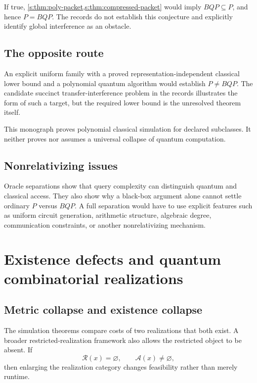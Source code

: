 If true, \cref{s:thm:poly-packet,s:thm:compressed-packet} would imply $BQP\subseteq P$, and hence $P=BQP$. The records do not establish this conjecture and explicitly identify global interference as an obstacle.

\subsection{The opposite route}
An explicit uniform family with a proved representation-independent classical lower bound and a polynomial quantum algorithm would establish $P\neq BQP$. The candidate succinct transfer-interference problem in the records illustrates the form of such a target, but the required lower bound is the unresolved theorem itself.

\begin{scopebox}
This monograph proves polynomial classical simulation for declared subclasses. It neither proves nor assumes a universal collapse of quantum computation.
\end{scopebox}

\subsection{Nonrelativizing issues}
Oracle separations show that query complexity can distinguish quantum and classical access. They also show why a black-box argument alone cannot settle ordinary $P$ versus $BQP$. A full separation would have to use explicit features such as uniform circuit generation, arithmetic structure, algebraic degree, communication constraints, or another nonrelativizing mechanism.

\section{Existence defects and quantum combinatorial realizations}
\label{s:ch:existence-defects}

\subsection{Metric collapse and existence collapse}
The simulation theorems compare costs of two realizations that both exist. A broader restricted-realization framework also allows the restricted object to be absent. If
\[
\mathcal R(x)=\varnothing,
\qquad
\mathcal A(x)\neq\varnothing,
\]
then enlarging the realization category changes feasibility rather than merely runtime.


